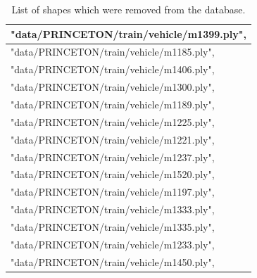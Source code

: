 \begin{table}[ht]
\begin{tabular}{|l|}
"data/PRINCETON/train/vehicle/m1399.ply",       \\ \hline
"data/PRINCETON/train/vehicle/m1185.ply",       \\ \hline
"data/PRINCETON/train/vehicle/m1406.ply",       \\ \hline
"data/PRINCETON/train/vehicle/m1300.ply",       \\ \hline
"data/PRINCETON/train/vehicle/m1189.ply",       \\ \hline
"data/PRINCETON/train/vehicle/m1225.ply",       \\ \hline
"data/PRINCETON/train/vehicle/m1221.ply",       \\ \hline
"data/PRINCETON/train/vehicle/m1237.ply",       \\ \hline
"data/PRINCETON/train/vehicle/m1520.ply",       \\ \hline
"data/PRINCETON/train/vehicle/m1197.ply",       \\ \hline
"data/PRINCETON/train/vehicle/m1333.ply",       \\ \hline
"data/PRINCETON/train/vehicle/m1335.ply",       \\ \hline
"data/PRINCETON/train/vehicle/m1233.ply",       \\ \hline
"data/PRINCETON/train/vehicle/m1450.ply",       \\ \hline
\end{tabular}
\caption{List of shapes which were removed from the database.}
\label{tab:my-table}
\end{table}

